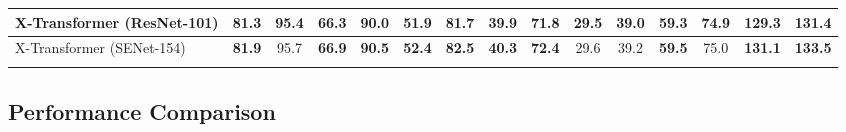\documentclass[10pt,twocolumn,letterpaper]{article}
\begin{document}
\begin{table*}[!tb]
\begin{tabular}{l|*{13}{c|}c}
			{X-Transformer (ResNet-101)}                & 81.3 & 95.4 & 66.3 & 90.0 & 51.9 & 81.7 & 39.9 & 71.8 & 29.5 & 39.0 & 59.3 & 74.9 & 129.3 & 131.4 \\\hline
			{X-Transformer (SENet-154)}                 & \textbf{81.9} & 95.7 & \textbf{66.9} & \textbf{90.5} & \textbf{52.4} & \textbf{82.5} & \textbf{40.3} & \textbf{72.4} & 29.6 & 39.2 & \textbf{59.5} & 75.0 & \textbf{131.1} & \textbf{133.5} \\
      \Xhline{2\arrayrulewidth}
  \end{tabular}
  \vspace{-0.15in}
\end{table*}



\subsection{Performance Comparison}
\end{document}
